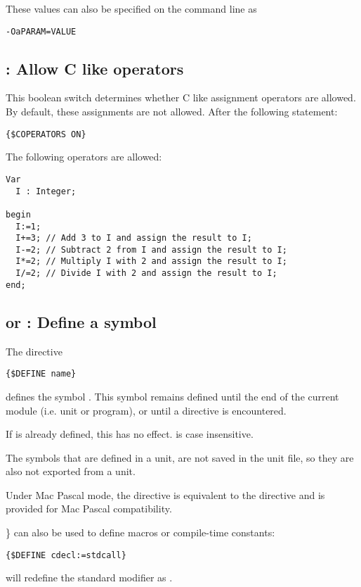 These values can also be specified on the command line as
\begin{verbatim}
-OaPARAM=VALUE
\end{verbatim}

\subsection{ : Allow C like operators}
This boolean switch determines whether C like assignment operators 
are allowed. By default, these assignments are not allowed.
After the following statement:
\begin{verbatim}
{$COPERATORS ON}
\end{verbatim}
The following operators are allowed:
\begin{verbatim}
Var
  I : Integer;

begin
  I:=1;
  I+=3; // Add 3 to I and assign the result to I;
  I-=2; // Subtract 2 from I and assign the result to I;
  I*=2; // Multiply I with 2 and assign the result to I;
  I/=2; // Divide I with 2 and assign the result to I;
end;  
\end{verbatim}

\subsection{ or  : Define a symbol}
The directive
\begin{verbatim}
{$DEFINE name}
\end{verbatim}
defines the symbol . This symbol remains defined until the end of
the current module (i.e. unit or program), or until a  directive is encountered.

If  is already defined, this has no effect.  is case
insensitive.

The symbols that are defined in a unit, are not saved in the unit file,
so they are also not exported from a unit.

Under Mac Pascal mode, the  directive is equivalent to the 
 directive and is provided for Mac Pascal compatibility.

\} can also be used to define macros or compile-time constants:
\begin{verbatim}
{$DEFINE cdecl:=stdcall}
\end{verbatim}
will redefine the standard modifier  as .

